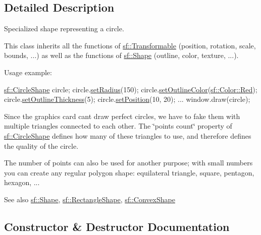 \subsection{Detailed Description}
Specialized shape representing a circle. 

This class inherits all the functions of \hyperlink{classsf_1_1_transformable}{sf\+::\+Transformable} (position, rotation, scale, bounds, ...) as well as the functions of \hyperlink{classsf_1_1_shape}{sf\+::\+Shape} (outline, color, texture, ...).

Usage example\+: 
\begin{DoxyCode}
\hyperlink{classsf_1_1_circle_shape}{sf::CircleShape} circle;
circle.\hyperlink{classsf_1_1_circle_shape_a21cdf85fc2f201e10222a241af864be0}{setRadius}(150);
circle.\hyperlink{classsf_1_1_shape_a5978f41ee349ac3c52942996dcb184f7}{setOutlineColor}(\hyperlink{classsf_1_1_color_a127dbf55db9c07d0fa8f4bfcbb97594a}{sf::Color::Red});
circle.\hyperlink{classsf_1_1_shape_a5ad336ad74fc1f567fce3b7e44cf87dc}{setOutlineThickness}(5);
circle.\hyperlink{classsf_1_1_transformable_a4dbfb1a7c80688b0b4c477d706550208}{setPosition}(10, 20);
...
window.draw(circle);
\end{DoxyCode}


Since the graphics card can\textquotesingle{}t draw perfect circles, we have to fake them with multiple triangles connected to each other. The \char`\"{}points count\char`\"{} property of \hyperlink{classsf_1_1_circle_shape}{sf\+::\+Circle\+Shape} defines how many of these triangles to use, and therefore defines the quality of the circle.

The number of points can also be used for another purpose; with small numbers you can create any regular polygon shape\+: equilateral triangle, square, pentagon, hexagon, ...

\begin{DoxySeeAlso}{See also}
\hyperlink{classsf_1_1_shape}{sf\+::\+Shape}, \hyperlink{classsf_1_1_rectangle_shape}{sf\+::\+Rectangle\+Shape}, \hyperlink{classsf_1_1_convex_shape}{sf\+::\+Convex\+Shape} 
\end{DoxySeeAlso}


\subsection{Constructor \& Destructor Documentation}
\mbox{\label{classsf_1_1_circle_shape_aaebe705e7180cd55588eb19488af3af1}} 
